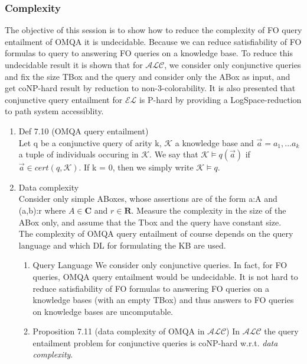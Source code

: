 \documentclass[11pt]{article}
\begin{document}
\subsubsection{Complexity}
\label{sec-1-2-2}
The objective of this session is to show how to reduce the 
complexity of FO query entailment of OMQA it is undecidable. 
Because we can reduce satisfiability of FO formulas to query to
answering FO queries on a knowledge base. To reduce this undecidable
result it is shown that for $\mathcal{A}\mathcal{L}\mathcal{C}$,
we consider only conjunctive queries and fix the size TBox and the 
query and consider only the ABox as input, and get coNP-hard result 
by reduction to non-3-colorability.
It is also presented that conjunctive query entailment for 
$\mathcal{E}\mathcal{L}$ is P-hard by providing a LogSpace-reduction 
to path system accessiblity.
\begin{enumerate}
\item Def 7.10 (OMQA query entailment) \\
\label{sec-1-2-2-1}
Let q be a conjunctive query of arity k, $\mathcal{K}$ a knowledge
base and $\overset{\to}{a} = a_{1}, ... a_{k}$ a tuple of individuals
occuring in $\mathcal{K}$.
We say that $\mathcal{K} \models q(\overset{\to}{a})$ if 
$\overset{\to}{a} \in cert(q,\mathcal{K})$. If k = 0, then we 
simply write $\mathcal{K} \models q$.
\item Data complexity \\
\label{sec-1-2-2-2}
Consider only simple ABoxes, whose assertions are of the form
a:A and (a,b):r where $A\in \mathbf{C}$ and $r \in \mathbf{R}$.
Measure the complexity in the size of the ABox only, and
assume that the Tbox and the query have constant size.\\
     The complexity of OMQA query entailment of course depends on the 
query language and which DL for formulating the KB are used.
\begin{enumerate}
\item Query Language
\label{sec-1-2-2-2-1}
We consider only conjunctive queries.
In fact, for FO queries, OMQA query entailment would be 
undecidable. It is not hard to reduce satisfiability of FO formulas
to answering FO queries on a knowledge bases (with an empty TBox)
and thus answers to FO queries on knowledge bases are uncomputable.
\item Proposition 7.11 (data complexity of OMQA in $\mathcal{A}\mathcal{L}\mathcal{C}$)
\label{sec-1-2-2-2-2}
  In $\mathcal{A}\mathcal{L}\mathcal{C}$ the query entailment
  problem for conjunctive queries is coNP-hard w.r.t. \textit{data complexity}. 

\end{enumerate}
\end{enumerate}
\end{document}
